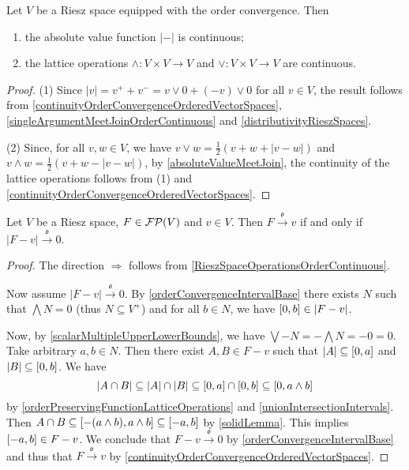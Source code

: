 \begin{lemma} \label{RieszSpaceOperationsOrderContinuous}
Let $V$ be a Riesz space equipped with the order convergence. Then
\begin{enumerate}
\item the absolute value function $|-|$ is continuous;
\item the lattice operations $\wedge: V\times V \to V$ and $\vee: V\times V \to V$ are continuous.
\end{enumerate}
\end{lemma}
\begin{proof}
(1) Since $|v| = v^+ + v^- = v\vee 0 + (-v)\vee 0$ for all $v\in V$, the result follows from \ref{continuityOrderConvergenceOrderedVectorSpaces}, \ref{singleArgumentMeetJoinOrderContinuous} and \ref{distributivityRieszSpaces}.

(2) Since, for all $v,w\in V$, we have $v\vee w = \frac{1}{2}(v+w + |v-w|)$ and $v\wedge w = \frac{1}{2}(v+w - |v-w|)$, by \ref{absoluteValueMeetJoin}, the continuity of the lattice operations follows from (1) and \ref{continuityOrderConvergenceOrderedVectorSpaces}.
\end{proof}

\begin{lemma} \label{orderConvergenceInRieszSpaceLemma}
Let $V$ be a Riesz space, $F\in\operatorname{\mathcal{FP}}(V)$ and $v\in V$. Then $F\overset{\mathfrak{o}}{\longrightarrow} v$ \textup{if and only if} $|F-v|\overset{\mathfrak{o}}{\longrightarrow} 0$.
\end{lemma}
\begin{proof}
The direction $\Rightarrow$ follows from \ref{RieszSpaceOperationsOrderContinuous}.

Now assume $|F-v|\overset{\mathfrak{o}}{\longrightarrow} 0$. By \ref{orderConvergenceIntervalBase} there exists $N$ such that $\bigwedge N = 0$ (thus $N\subseteq V^+$) and for all $b\in N$, we have $\interval{0,b} \in |F-v|$.

Now, by \ref{scalarMultipleUpperLowerBounds}, we have $\bigvee -N = -\bigwedge N = -0 = 0$. Take arbitrary $a, b\in N$. Then there exist $A, B\in F-v$ such that $|A| \subseteq \interval{0, a}$ and $|B|\subseteq \interval{0,b}$. We have
\[ |A\cap B| \subseteq |A|\cap |B| \subseteq \interval{0,a}\cap \interval{0,b} \subseteq \interval{0,a\wedge b} \]
by \ref{orderPreservingFunctionLatticeOperations} and \ref{unionIntersectionIntervals}. Then $A\cap B \subseteq \interval{-(a\wedge b),a\wedge b} \subseteq \interval{-a, b}$ by \ref{solidLemma}. This implies $\interval{-a,b} \in F-v$. We conclude that $F-v\overset{\mathfrak{o}}{\longrightarrow} 0$ by \ref{orderConvergenceIntervalBase} and thus that $F\overset{\mathfrak{o}}{\longrightarrow} v$ by \ref{continuityOrderConvergenceOrderedVectorSpaces}.
\end{proof}

